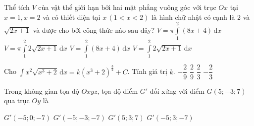 \begin{ex}%
Thể tích $V$ của vật thể  giới hạn bởi hai mặt phẳng vuông góc với trục $Ox$ tại $x=1, x=2$ và có thiết diện tại $x \, (1<x<2)$ là hình chữ nhật có cạnh là $2$ và $\sqrt{2x+1}$ và được cho bởi công thức nào sau đây?
	\choice
	{$V=\pi\displaystyle\int\limits_{1}^{2} (8x+4)\mathrm{\,d}x$}
	{$V=\pi\displaystyle\int\limits_{1}^{2} 2\sqrt{2x+1}\mathrm{\,d}x$}
	{ $V=\displaystyle\int\limits_{1}^{2} (8x+4)\mathrm{\,d}x$}
	{\True $V=\displaystyle\int\limits_{1}^{2} 2\sqrt{2x+1}\mathrm{\,d}x$}
\end{ex}

\begin{ex}%
Cho $\displaystyle\int\limits x^2\sqrt{x^3+2}\mathrm{\,d}x=k \left(x^3+2 \right)^{\frac{3}{2}} +C$. Tính giá trị $k$.
	\choice
	{$-\dfrac{2}{9}$}
	{\True $\dfrac{2}{9}$}
	{$\dfrac{2}{3}$}
	{ $- \dfrac{2}{3}$}
\end{ex}

\begin{ex}%
	Trong không gian tọa độ $Oxyz$, tọa độ điểm $G'$ đối xứng với điểm $G(5;-3;7)$ qua trục $Oy$ là
		
	\choice
	{ $G'(-5;0;-7)$}
	{\True $G'(-5;-3;-7)$}
	{$G'(5;3;7)$}
	{$G'(-5;3;-7)$}
\end{ex} 


